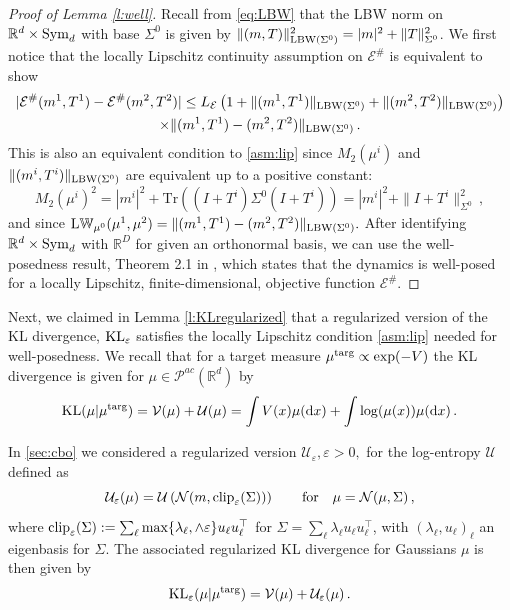 \documentclass{article}
\theoremstyle{plain}
\theoremstyle{definition}
\theoremstyle{remark}
\newcommand{\Rd}{ {\mathbb{R}^d}}
\newcommand{\R}{ \mathbb{R}}
\newcommand{\E}{\mathcal{E}}
\newcommand{\ve}{\varepsilon}
\renewcommand{\d}{\mathrm{d}}
\newcommand{\sym}{\textup{Sym}_d}
\newcommand{\KL}{\textup{KL}}
\newcommand{\LW}{\textup{L}\mathbb{W}}
\newcommand{\targ}{\textup{targ}}
\newcommand{\clip}{\textup{clip}}
\begin{document}
\begin{proof}[Proof of Lemma \ref{l:well}]
Recall from \eqref{eq:LBW} that the LBW norm on $\Rd\times \sym$ with base $\Sigma^0$ is given by  $\| (m,T) \|_{\textup{LBW}(\Sigma^0)}^2   = |m|^2 + \| T\|^2_{\Sigma^0}$.
We first notice that the locally Lipschitz continuity assumption on $\E^\#$ is equivalent to show
\begin{multline*}
 |\E^\#(m^1,T^1) - \E^\#(m^2,T^2)|\leq L_\E \left(1  + \|(m^1,T^1)\|_{\textup{LBW}(\Sigma^0)} + \|(m^2,T^2)\|_{\textup{LBW}(\Sigma^0)} \right) \\
 \times \|(m^1,T^1)- (m^2,T^2)\|_{\textup{LBW}(\Sigma^0)}\,.
\end{multline*}
This is also an equivalent condition to \eqref{asm:lip} since $M_2(\mu^i)$ and  $\|(m^i,T^i)\|_{\textup{LBW}(\Sigma^0)}$ are equivalent up to a positive constant:
\begin{equation} \label{eq:moments}
M_2(\mu^i)^2 = |m^i|^2 + \text{Tr}((I + T^i)\Sigma^0(I + T^i)) = |m^i|^2 + \|I + T^i\|^2_{\Sigma^0}\,,
\end{equation}
and since 
$
\LW_{\mu^0}(\mu^1, \mu^2) = \|(m^1,T^1)- (m^2,T^2)\|_{\textup{LBW}(\Sigma^0)}.
$
After identifying $\Rd \times \sym$ with $\R^D$ for given an orthonormal basis, we can use the well-posedness result, Theorem 2.1 in \cite{carrillo2018analytical}, which states that the dynamics is well-posed for a locally Lipschitz, finite-dimensional, objective function $\E^\#$. 
\end{proof}


Next, we claimed in Lemma \ref{l:KLregularized} that a regularized version of the KL divergence, $\KL_\ve$ satisfies the locally Lipschitz condition \eqref{asm:lip} needed for well-posedness.
We recall that for a target measure $\mu^\targ \propto \exp(-V)$ the KL divergence is given for $\mu \in \mathcal{P}^{ac}(\Rd)$ by
\[
\KL(\mu | \mu^\targ)  = \mathcal{V}(\mu) + \mathcal{U}(\mu)
= \int V(x) \mu(\d x) + \int \log(\mu(x))\mu(\d x)\,.
\]

In \cref{sec:cbo} we considered a regularized version $\mathcal{U}_\ve, \ve>0,$ for the log-entropy $\mathcal{U}$ defined as
\[
\mathcal{U}_\ve(\mu) = \mathcal{U}\left(\mathcal{N}(m, \clip_\ve(\Sigma)) \right)\qquad \textup{for}\quad \mu= \mathcal{N}(\mu, \Sigma)\,,
\]
where $\textup{clip}_\ve(\Sigma) := \sum_{\ell} \max\{\lambda_\ell, \wedge \ve \} u_\ell u_\ell^\top $ for $\Sigma = \sum_{\ell} \lambda_\ell u_\ell u_\ell^\top$,  with $(\lambda_\ell, u_\ell)_\ell$ an eigenbasis for $\Sigma$. The associated regularized  KL divergence for Gaussians $\mu$ is then given by 
\[
\KL_\ve(\mu | \mu^\targ)  = \mathcal{V}(\mu) + \mathcal{U}_\ve(\mu)\,.
\]
\end{document}
